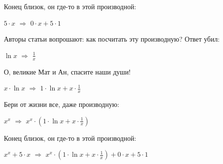 Конец близок, он где-то в этой производной:

$5 \cdot x$ $\Rightarrow$ $0 \cdot x + 5 \cdot 1$

Авторы статьи вопрошают: как посчитать эту производную? Ответ убил:

$ \ln x$ $\Rightarrow$ $\frac{1}{x}$

О, великие Мат и Ан, спасите наши души!

$x \cdot  \ln x$ $\Rightarrow$ $1 \cdot  \ln x + x \cdot \frac{1}{x}$

Бери от жизни все, даже производную:

$x ^ {x}$ $\Rightarrow$ $x ^ {x} \cdot (1 \cdot  \ln x + x \cdot \frac{1}{x})$

Конец близок, он где-то в этой производной:

$x ^ {x} + 5 \cdot x$ $\Rightarrow$ $x ^ {x} \cdot (1 \cdot  \ln x + x \cdot \frac{1}{x}) + 0 \cdot x + 5 \cdot 1$

